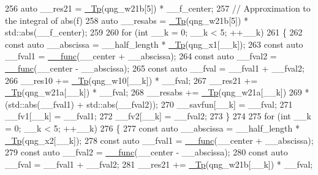 \begin{DoxyCode}
256       \textcolor{keyword}{auto} \_\_res21 = \hyperlink{namespace____gnu__cxx_a3b19a9c800ca194374ef9172290f7d79}{\_Tp}(qng\_w21b[5]) * \_\_f\_center;
257       \textcolor{comment}{// Approximation to the integral of abs(f)}
258       \textcolor{keyword}{auto} \_\_resabs = \hyperlink{namespace____gnu__cxx_a3b19a9c800ca194374ef9172290f7d79}{\_Tp}(qng\_w21b[5]) * std::abs(\_\_f\_center);
259 
260       \textcolor{keywordflow}{for} (\textcolor{keywordtype}{int} \_\_k = 0; \_\_k < 5; ++\_\_k)
261         \{
262           \textcolor{keyword}{const} \textcolor{keyword}{auto} \_\_abscissa = \_\_half\_length * \hyperlink{namespace____gnu__cxx_a3b19a9c800ca194374ef9172290f7d79}{\_Tp}(qng\_x1[\_\_k]);
263           \textcolor{keyword}{const} \textcolor{keyword}{auto} \_\_fval1 = \hyperlink{namespace____gnu__cxx_af2b2f0c7a2ae72b922b1afefae5a65b2}{\_\_func}(\_\_center + \_\_abscissa);
264           \textcolor{keyword}{const} \textcolor{keyword}{auto} \_\_fval2 = \hyperlink{namespace____gnu__cxx_af2b2f0c7a2ae72b922b1afefae5a65b2}{\_\_func}(\_\_center - \_\_abscissa);
265           \textcolor{keyword}{const} \textcolor{keyword}{auto} \_\_fval = \_\_fval1 + \_\_fval2;
266           \_\_res10 += \hyperlink{namespace____gnu__cxx_a3b19a9c800ca194374ef9172290f7d79}{\_Tp}(qng\_w10[\_\_k]) * \_\_fval;
267           \_\_res21 += \hyperlink{namespace____gnu__cxx_a3b19a9c800ca194374ef9172290f7d79}{\_Tp}(qng\_w21a[\_\_k]) * \_\_fval;
268           \_\_resabs += \hyperlink{namespace____gnu__cxx_a3b19a9c800ca194374ef9172290f7d79}{\_Tp}(qng\_w21a[\_\_k])
269                     * (std::abs(\_\_fval1) + std::abs(\_\_fval2));
270           \_\_savfun[\_\_k] = \_\_fval;
271           \_\_fv1[\_\_k] = \_\_fval1;
272           \_\_fv2[\_\_k] = \_\_fval2;
273         \}
274 
275       \textcolor{keywordflow}{for} (\textcolor{keywordtype}{int} \_\_k = 0; \_\_k < 5; ++\_\_k)
276         \{
277           \textcolor{keyword}{const} \textcolor{keyword}{auto} \_\_abscissa = \_\_half\_length * \hyperlink{namespace____gnu__cxx_a3b19a9c800ca194374ef9172290f7d79}{\_Tp}(qng\_x2[\_\_k]);
278           \textcolor{keyword}{const} \textcolor{keyword}{auto} \_\_fval1 = \hyperlink{namespace____gnu__cxx_af2b2f0c7a2ae72b922b1afefae5a65b2}{\_\_func}(\_\_center + \_\_abscissa);
279           \textcolor{keyword}{const} \textcolor{keyword}{auto} \_\_fval2 = \hyperlink{namespace____gnu__cxx_af2b2f0c7a2ae72b922b1afefae5a65b2}{\_\_func}(\_\_center - \_\_abscissa);
280           \textcolor{keyword}{const} \textcolor{keyword}{auto} \_\_fval = \_\_fval1 + \_\_fval2;
281           \_\_res21 += \hyperlink{namespace____gnu__cxx_a3b19a9c800ca194374ef9172290f7d79}{\_Tp}(qng\_w21b[\_\_k]) * \_\_fval;

\end{DoxyCode}
